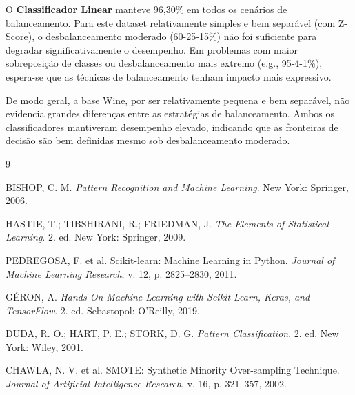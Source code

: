 \documentclass[12pt,a4paper]{article}
\begin{document}
O \textbf{Classificador Linear} manteve 96,30\% em todos os cenários de balanceamento. Para este dataset relativamente simples e bem separável (com Z-Score), o desbalanceamento moderado (60-25-15\%) não foi suficiente para degradar significativamente o desempenho. Em problemas com maior sobreposição de classes ou desbalanceamento mais extremo (e.g., 95-4-1\%), espera-se que as técnicas de balanceamento tenham impacto mais expressivo.

De modo geral, a base Wine, por ser relativamente pequena e bem separável, não evidencia grandes diferenças entre as estratégias de balanceamento. Ambos os classificadores mantiveram desempenho elevado, indicando que as fronteiras de decisão são bem definidas mesmo sob desbalanceamento moderado.


\newpage
\begin{thebibliography}{9}

BISHOP, C. M. \textit{Pattern Recognition and Machine Learning}. New York: Springer, 2006.

HASTIE, T.; TIBSHIRANI, R.; FRIEDMAN, J. \textit{The Elements of Statistical Learning}. 2. ed. New York: Springer, 2009.

PEDREGOSA, F. et al. Scikit-learn: Machine Learning in Python. \textit{Journal of Machine Learning Research}, v. 12, p. 2825--2830, 2011.

GÉRON, A. \textit{Hands-On Machine Learning with Scikit-Learn, Keras, and TensorFlow}. 2. ed. Sebastopol: O'Reilly, 2019.

DUDA, R. O.; HART, P. E.; STORK, D. G. \textit{Pattern Classification}. 2. ed. New York: Wiley, 2001.

CHAWLA, N. V. et al. SMOTE: Synthetic Minority Over-sampling Technique. \textit{Journal of Artificial Intelligence Research}, v. 16, p. 321--357, 2002.

\end{thebibliography}
\end{document}
